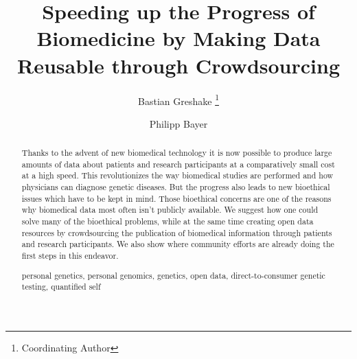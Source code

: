 \documentclass[runningheads,a4paper]{llncs}
\newcommand{\keywords}[1]{\par\addvspace\baselineskip
\noindent\keywordname\enspace\ignorespaces#1}
\begin{document}
\mainmatter  %

\title{Speeding up the Progress of Biomedicine by Making Data Reusable through Crowdsourcing }


%
%
\author{Bastian Greshake%
\thanks{Coordinating Author}%
\and Philipp Bayer}
%


%
%

\maketitle


\begin{abstract}
Thanks to the advent of new biomedical technology it is now possible to produce large amounts of data about patients and research participants at a comparatively small cost at a high speed. This revolutionizes the way biomedical studies are performed and how physicians can diagnose genetic diseases. But the progress also leads to new bioethical issues which have to be kept in mind. Those bioethical concerns are one of the reasons why biomedical data most often isn't publicly available. We suggest how one could solve many of the bioethical problems, while at the same time creating open data resources by crowdsourcing the publication of biomedical information through patients and research participants. We also show where community efforts are already doing the first steps in this endeavor.
\keywords{personal genetics, personal genomics, genetics, open data, direct-to-consumer genetic testing, quantified self}
\end{abstract}
\end{document}
